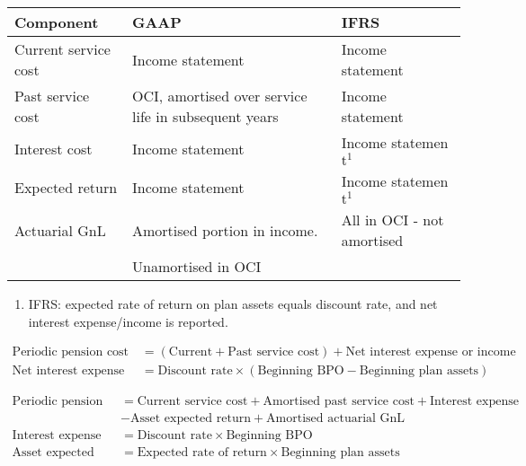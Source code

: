 \begin{flushleft}
\begin{tabularx}{\textwidth}{X|p{22em}|X}
\hline
\rowcolor{gray!30}
Component & GAAP & IFRS \\
\hline
Current service cost & Income statement & Income statement \nonumber \\
\hline
Past service cost & OCI, amortised over service life in subsequent years & Income statement \nonumber \\
\hline
Interest cost & Income statement & Income statemen$\text{t}^1$ \nonumber \\
\hline
Expected return & Income statement & Income statemen$\text{t}^1$ \nonumber \\
\hline
Actuarial GnL & Amortised portion in income. & All in OCI - not amortised \nonumber \\
& Unamortised in OCI & \nonumber \\
\hline
\end{tabularx}
\begin{enumerate}[label=\arabic*., before=\small]
\setlength{\itemsep}{0pt}
\item IFRS: expected rate of return on plan assets equals discount rate, and net interest expense/income is reported.
\end{enumerate}
\end{flushleft}


\begin{method} 
\begin{align}
\text{Periodic pension cost} &= (\text{Current} + \text{Past service cost}) + \text{Net interest expense or income} \nonumber \\
\text{Net interest expense or income} &= \text{Discount rate} \times (\text{Beginning BPO} - \text{Beginning plan assets}) \nonumber
\end{align}
\end{method}

\begin{method} 
\begin{align}
\text{Periodic pension cost} &= \text{Current service cost} + \text{Amortised past service cost} + \text{Interest expense} \nonumber \\
&- \text{Asset expected return} + \text{Amortised actuarial GnL} \nonumber \\
\text{Interest expense} &= \text{Discount rate} \times \text{Beginning BPO} \nonumber \\
\text{Asset expected return} &= \text{Expected rate of return} \times \text{Beginning plan assets} \nonumber
\end{align}
\end{method}

